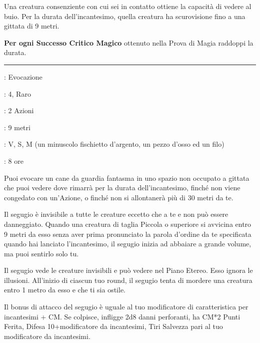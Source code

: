 \begin{multicols}{2}
Una creatura consenziente con cui sei in contatto ottiene la capacità di vedere al buio. Per la durata dell'incantesimo, quella creatura ha scurovisione fino a una gittata di 9 metri.

\textbf{Per ogni Successo Critico Magico} ottenuto nella Prova di Magia raddoppi la durata.

\smallskip\noindent\rule{\linewidth}{2pt} \hypertarget{Segugio Fedele}{}\medskip{}
\noindent
\begin{description}[noitemsep, topsep=0pt, parsep=0pt, partopsep=0pt, leftmargin=0cm, labelwidth=2.8cm]
	\item[\textbf{Lista di Magia}]: Evocazione
	\item[\textbf{Livello}]: 4, Raro
	\item[\textbf{T. di Lancio}]: 2 Azioni
	\item[\textbf{Gittata}]: 9 metri
	\item[\textbf{Componenti}]: V, S, M (un minuscolo fischietto d'argento, un pezzo d'osso ed un filo)
	\item[\textbf{Durata}]: 8 ore
\end{description}

Puoi evocare un cane da guardia fantasma in uno spazio non occupato a gittata che puoi vedere dove rimarrà per la durata dell'incantesimo, finché non viene congedato con un'Azione, o finché non si allontanerà più di 30 metri da te.

Il segugio è invisibile a tutte le creature eccetto che a te e non può essere danneggiato. Quando una creatura di taglia Piccola o superiore si avvicina entro 9 metri da esso senza aver prima pronunciato la parola d'ordine da te specificata quando hai lanciato l'incantesimo, il segugio inizia ad abbaiare a grande volume, ma puoi sentirlo solo tu.

Il segugio vede le creature invisibili e può vedere nel Piano Etereo. Esso ignora le illusioni. All'inizio di ciascun tuo round, il segugio tenta di mordere una creatura entro 1 metro da esso e che ti sia ostile.

Il bonus di attacco del segugio è uguale al tuo modificatore di caratteristica per incantesimi + CM. Se colpisce, infligge 2d8 danni perforanti, ha CM*2 Punti Ferita, Difesa 10+modificatore da incantesimi, Tiri Salvezza pari al tuo modificatore da incantesimi.


\end{multicols}
